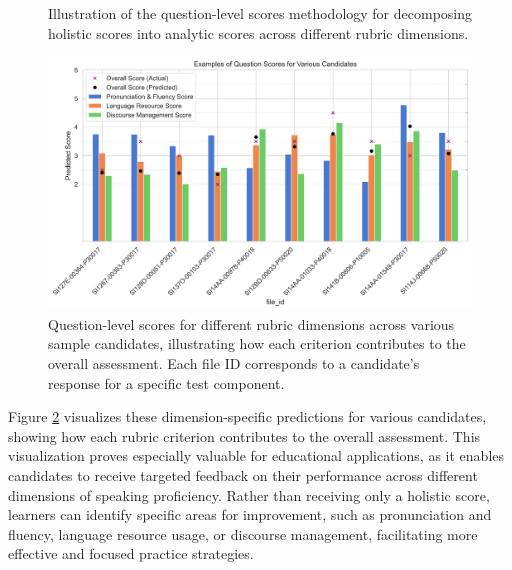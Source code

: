\documentclass{report}
\begin{document}
\begin{figure}[h]
  \centering
  \caption{Illustration of the question-level scores methodology for decomposing holistic scores into analytic scores across different rubric dimensions.}
  \label{fig:question_level_methodology}
\end{figure}

\begin{figure}[h]
  \centering
  \includegraphics[width=1\linewidth]{images/question_score_examples.png}
  \caption{Question-level scores for different rubric dimensions across various sample candidates, illustrating how each criterion contributes to the overall assessment. Each file ID corresponds to a candidate's response for a specific test component.}
  \label{fig:analytic_scores}
\end{figure}

Figure \ref{fig:analytic_scores} visualizes these dimension-specific predictions for various candidates, showing how each rubric criterion contributes to the overall assessment. This visualization proves especially valuable for educational applications, as it enables candidates to receive targeted feedback on their performance across different dimensions of speaking proficiency. Rather than receiving only a holistic score, learners can identify specific areas for improvement, such as pronunciation and fluency, language resource usage, or discourse management, facilitating more effective and focused practice strategies.
\end{document}
